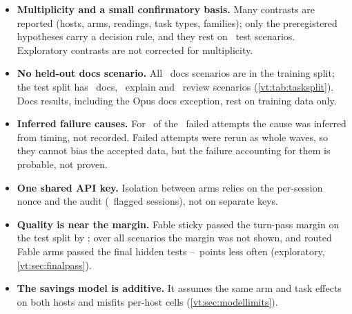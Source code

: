 \begin{itemize}
    measured.
  \item \textbf{Multiplicity and a small confirmatory basis.} Many contrasts are reported (hosts, arms, readings,
    task types, families); only the preregistered hypotheses carry a decision rule, and they rest on \NTest\
    test scenarios. Exploratory contrasts are not corrected for multiplicity.
  \item \textbf{No held-out docs scenario.} All \RvDocsTrain\ docs scenarios are in the training split; the test
    split has \RvDocsTest\ docs, \RvExplainTest\ explain and \RvReviewTest\ review scenarios (\cref{vt:tab:tasksplit}).
    Docs results, including the Opus docs exception, rest on training data only.
  \item \textbf{Inferred failure causes.} For \NFailedInferred\ of the \NFailed\ failed attempts the cause
    was inferred from timing, not recorded. Failed attempts were rerun as whole waves, so they cannot bias
    the accepted data, but the failure accounting for them is probable, not proven.
  \item \textbf{One shared API key.} Isolation between arms relies on the per-session nonce and the audit
    (\AuditFlagged\ flagged sessions), not on separate keys.
  \item \textbf{Quality is near the margin.} Fable sticky passed the turn-pass margin on the test split by
    \QFableStickyMarginGap; over all scenarios the margin was not shown, and routed Fable arms passed the
    final hidden tests \FinalGapLow--\FinalGapHigh\ points less often (exploratory, \cref{vt:sec:finalpass}).
  \item \textbf{The savings model is additive.} It assumes the same arm and task effects on both hosts and
    misfits per-host cells (\cref{vt:sec:modellimits}).
\end{itemize}
